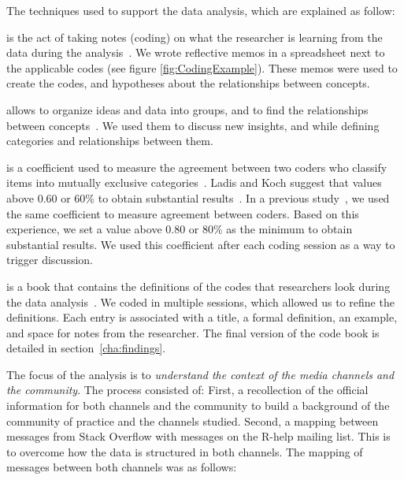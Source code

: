     The techniques used to support the data analysis, which are explained as follow:

	\begin{description}[itemsep=2pt, topsep=0pt, leftmargin=1em, parsep=0pt]
		\item[Memoing] is the act of taking notes (coding) on what the researcher is learning from the data during the analysis~\cite{Groenewald2008}.
        We wrote reflective memos in a spreadsheet next to the applicable codes (see figure \ref{fig:CodingExample}).
        These memos were used to create the codes, and hypotheses about the relationships between concepts.

		\item[Affinity diagrams] allows to organize ideas and data into groups, and to find the relationships between concepts~\cite{Scupin1997}.
		We used them to discuss new insights, and while defining categories and relationships between them.

		\item[Inter-rater agreement \textit{Cohen Kappa}] is a coefficient used to measure the agreement between two coders who classify items into mutually exclusive categories~\cite{Stemler2004}.
		Ladis and Koch suggest that values above 0.60 or 60\% to obtain substantial results~\cite{Landis1977}.
		In a previous study~\cite{Gomez2013}, we used the same coefficient to measure agreement between coders.
		Based on this experience, we set a value above 0.80 or 80\% as the minimum to obtain substantial results.
		We used this coefficient after each coding session as a way to trigger discussion.

		\item[Code book] is a book that contains the definitions of the codes that researchers look during the data analysis~\cite{MacQueen1998}.
		We coded in multiple sessions, which allowed us to refine the definitions.
		Each entry is associated with a title, a formal definition, an example, and space for notes from the researcher.
		The final version of the code book is detailed in section~\ref{cha:findings}.
	\end{description}

	The focus of the analysis is to \textit{understand the context of the media channels and the community}.
	The process consisted of:
	First, a recollection of the official information for both channels and the community to build a background of the community of practice and the channels studied.
	Second, a mapping between messages from Stack Overflow with messages on the R-help mailing list.
    This is to overcome how the data is structured in both channels.
    The mapping of messages between both channels was as follows:

